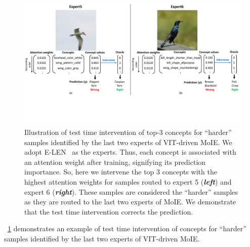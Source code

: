 \begin{figure}[h]
\centering
\includegraphics[width=1 \linewidth]{figures/Supp/TTI_qual.pdf}
\caption{Illustration of test time intervention of top-3 concepts for ``harder'' samples identified by the last two experts of VIT-driven MoIE. We adopt E-LEN~\cite{barbiero2022entropy} as the experts. Thus, each concept is associated with an attention weight after training, signifying its prediction importance. So, here we intervene the top 3 concepts with the highest attention weights for samples routed to expert 5 (\textbf{\emph{left}}) and expert 6 (\textbf{\emph{right}}). These samples are considered the ``harder'' samples as they are routed to the last two experts of MoIE. We demonstrate that the test time intervention corrects the prediction. }
\label{fig:tti_qual}
\vspace{-2.5pt}
\end{figure}
~\cref{fig:tti_qual} demonstrates an example of test time intervention of concepts for ``harder'' samples identified by the last two experts of VIT-driven MoIE.